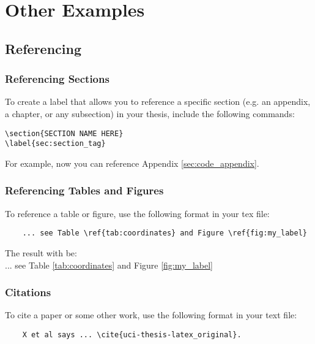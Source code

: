 \chapter{Other Examples}


\section{Referencing}
\subsection{Referencing Sections}
To create a label that allows you to reference a specific section (e.g. an appendix, a chapter, or any subsection) in your thesis, include the following commands:
\begin{verbatim}
\section{SECTION NAME HERE}     
\label{sec:section_tag}
\end{verbatim}

For example, now you can reference Appendix \ref{sec:code_appendix}.

\subsection{Referencing Tables and Figures}
To reference a table or figure, use the following format in your tex file:
\begin{verbatim}
    ... see Table \ref{tab:coordinates} and Figure \ref{fig:my_label}
\end{verbatim}
The result with be:\\
... see Table \ref{tab:coordinates} and Figure \ref{fig:my_label}

\subsection{Citations}
To cite a paper or some other work, use the following format in your text file:
\begin{verbatim}
    X et al says ... \cite{uci-thesis-latex_original}.
\end{verbatim}

